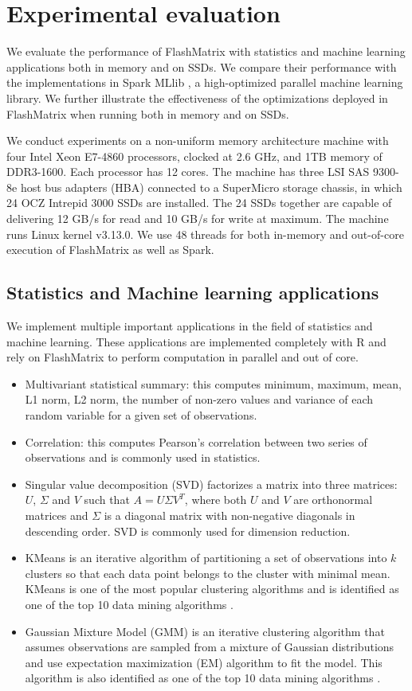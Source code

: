 \section{Experimental evaluation}
We evaluate the performance of FlashMatrix with statistics and machine learning
applications both in memory and on SSDs. We compare their
performance with the implementations in Spark MLlib \cite{mllib},
a high-optimized parallel machine learning library. We further
illustrate the effectiveness of the optimizations deployed in FlashMatrix
when running both in memory and on SSDs.

We conduct experiments on a non-uniform memory architecture machine with
four Intel Xeon E7-4860 processors, clocked at 2.6 GHz, and 1TB memory of
DDR3-1600. Each processor has 12 cores. The machine has three LSI SAS 9300-8e
host bus adapters (HBA) connected to a SuperMicro storage chassis, in which
24 OCZ Intrepid 3000 SSDs are installed. The 24 SSDs together are capable of
delivering 12 GB/s for read and 10 GB/s for write at maximum. The machine runs
Linux kernel v3.13.0. We use 48 threads for both in-memory and out-of-core
execution of FlashMatrix as well as Spark.

\subsection{Statistics and Machine learning applications} \label{sec:apps}
We implement multiple important applications in the field of statistics and
machine learning. These applications are implemented completely with R and
rely on FlashMatrix to perform computation in parallel and out of core.
\begin{itemize}
	\item Multivariant statistical summary: this computes minimum, maximum,
		mean, L1 norm, L2 norm, the number of non-zero values and variance
		of each random variable for a given set of observations.
	\item Correlation: this computes Pearson's correlation \cite{} between
		two series of observations and is commonly used in statistics.
	\item Singular value decomposition (SVD) factorizes a matrix into
		three matrices: $U$, $\Sigma$ and $V$ such that $A=U \Sigma V^T$, where
		both $U$ and $V$ are orthonormal matrices and $\Sigma$ is a diagonal
		matrix with non-negative diagonals in descending order. SVD is commonly
		used for dimension reduction.
	\item KMeans \cite{kmeans} is an iterative algorithm of partitioning a set
		of observations into $k$ clusters
		so that each data point belongs to the cluster with minimal mean. KMeans
		is one of the most popular clustering algorithms and is identified as
		one of the top 10 data mining algorithms \cite{top10}.
	\item Gaussian Mixture Model (GMM) \cite{gmm} is an iterative clustering
		algorithm that assumes observations are sampled from a mixture of
		Gaussian distributions and use expectation maximization (EM) \cite{gmm}
		algorithm to fit the model. This algorithm is also identified as one
		of the top 10 data mining algorithms \cite{top10}.
\end{itemize}

